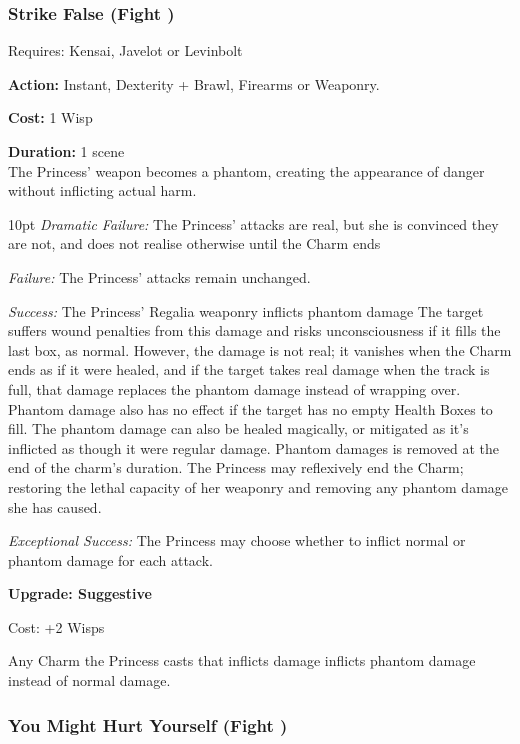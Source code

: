 \subsubsection*{Strike False (Fight \textbullet\textbullet)}

\noindent Requires: Kensai, Javelot or Levinbolt

\noindent \textbf{Action:} Instant, Dexterity + Brawl, Firearms or Weaponry.

\noindent \textbf{Cost:} 1 Wisp

\noindent \textbf{Duration:} 1 scene \\

\noindent The Princess' weapon becomes a phantom, creating the appearance of danger without inflicting actual harm.

\begin{myindentpar}{10pt} 
\emph{Dramatic Failure:} The Princess' attacks are real, but she is convinced they are not, and does not realise otherwise until the Charm ends

\emph{Failure:} The Princess' attacks remain unchanged.

\emph{Success:} The Princess' Regalia weaponry inflicts phantom damage The target suffers wound penalties from this damage and risks unconsciousness if it fills the last box, as normal. However, the damage is not real; it vanishes when the Charm ends as if it were healed, and if the target takes real damage when the track is full, that damage replaces the phantom damage instead of wrapping over. Phantom damage also has no effect if the target has no empty Health Boxes to fill. The phantom damage can also be healed magically, or mitigated as it's inflicted as though it were regular damage. Phantom damages is removed at the end of the charm's duration. The Princess may reflexively end the Charm; restoring the lethal capacity of her weaponry and removing any phantom damage she has caused. 

\emph{Exceptional Success:} The Princess may choose whether to inflict normal or phantom damage for each attack.

\textbf{Upgrade: Suggestive}

Cost: +2 Wisps

Any Charm the Princess casts that inflicts damage inflicts phantom damage instead of normal damage. 

\end{myindentpar}
\subsubsection*{You Might Hurt Yourself (Fight \textbullet\textbullet)}

